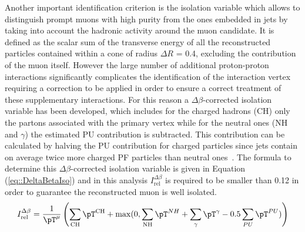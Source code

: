 Another important identification criterion is the isolation variable which allows to distinguish prompt muons with high purity from the ones embedded in jets by taking into account the hadronic 
activity around the muon candidate. %
It is defined as the scalar sum of the transverse energy of all the reconstructed particles contained within a cone of radius $\Delta R$ = 0.4, excluding the contribution of the muon itself.
However the large number of additional proton-proton interactions significantly complicates the identification of the interaction vertex requiring a correction to be applied in order to ensure a correct treatment of these supplementary interactions. 
For this reason a $\Delta \beta$-corrected isolation variable has been developed, which includes for the charged hadrons (CH) only the partons associated with the primary vertex while for the neutral ones (NH and $\gamma$) the estimated PU contribution is subtracted. This contribution can be calculated by halving the PU contribution for charged particles since jets contain on average twice more charged PF particles than neutral ones~\cite{CHContrVsN}. The formula to determine this $\Delta \beta$-corrected isolation variable is given in Equation (\ref{eq::DeltaBetaIso}) and in this analysis $I_{\textrm{rel}}^{\Delta \beta}$ is required to be smaller than 0.12 in order to guarantee the reconstructed muon is well isolated.
\begin{equation}\label{eq::DeltaBetaIso}
 I_{\textrm{rel}}^{\Delta \beta} = \frac{1}{\pT^{\mu}} \left( \sum_{\textrm{CH}} \pT^{\textrm{CH}} + \max(0, \sum_{\textrm{NH}} \pT^{NH} + \sum_{\gamma} \pT^{\gamma} - 0.5 \sum_{PU} \pT^{PU}) \right)
\end{equation}
%

